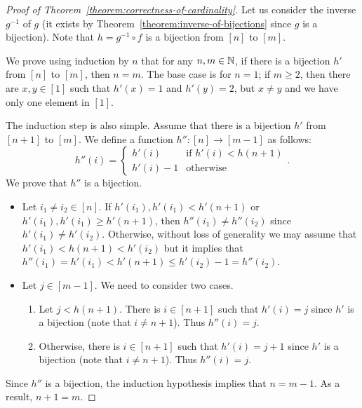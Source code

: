 \begin{proof}[Proof of Theorem~\ref{theorem:correctness-of-cardinality}]
  Let us consider the inverse $g^{-1}$ of $g$ (it exists by
  Theorem~\ref{theorem:inverse-of-bijections} since $g$ is a
  bijection). Note that $h = g^{-1} \circ f$
  is a bijection from $[n]$ to $[m]$.

  We prove using induction by $n$ that for any $n, m \in \mathbb{N}$,
  if there is a bijection $h'$ from $[n]$ to $[m]$, then $n = m$.
  The base case is for $n = 1$; if $m \ge 2$,
  then there are $x, y \in [1]$ such that $h'(x) = 1$ and $h'(y) = 2$, but
  $x \neq y$ and we have only one element in $[1]$.

  The induction step is also simple. Assume that there is a bijection $h'$ from
  $[n + 1]$ to $[m]$. We define a function $h'' : [n] \to [m - 1]$ as follows:
  \[
    h''(i) =
    \begin{cases}
      h'(i) & \text{if } h'(i) < h(n + 1) \\
      h'(i) - 1 & \text{otherwise}
    \end{cases}.
  \]
  We prove that $h''$ is a bijection.
  \begin{itemize}
    \item Let $i_1 \neq i_2 \in [n]$. If $h'(i_1), h'(i_1) < h'(n + 1)$ or
      $h'(i_1), h'(i_1) \ge h'(n + 1)$, then $h''(i_1) \neq h''(i_2)$ since
      $h'(i_1) \neq h'(i_2)$. Otherwise, without loss of generality we
      may assume that $h'(i_1) < h(n + 1) < h'(i_2)$ but it implies that
      $h''(i_1) = h'(i_1) < h'(n + 1) \le h'(i_2) - 1 = h''(i_2)$.
    \item Let $j \in [m - 1]$. We need to consider two cases.
      \begin{enumerate}
        \item Let $j < h(n + 1)$. There is $i \in [n + 1]$ such that
          $h'(i) = j$ since $h'$ is a bijection (note that $i \neq n + 1$).
          Thus $h''(i) = j$.
        \item Otherwise, there is $i \in [n + 1]$ such that
          $h'(i) = j + 1$ since $h'$ is a bijection (note that $i \neq n + 1$).
          Thus $h''(i) = j$.
      \end{enumerate}
  \end{itemize}
  Since $h''$ is a bijection, the induction hypothesis implies that $n = m - 1$.
  As a result, $n + 1 = m$.
\end{proof}

